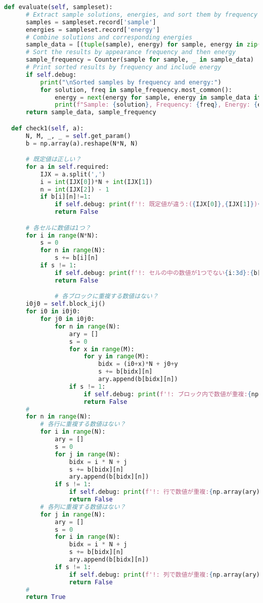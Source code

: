 \documentclass[uplatex,dvipdfmx,a4paper,11pt,oneside,openany]{jsbook}
\begin{document}
\begin{lstlisting}[language=Python]
    def evaluate(self, sampleset):
      # Extract sample solutions, energies, and sort them by frequency
      samples = sampleset.record['sample']
      energies = sampleset.record['energy']
      # Combine solutions and corresponding energies
      sample_data = [(tuple(sample), energy) for sample, energy in zip(samples, energies)]
      # Sort the results by appearance frequency and then energy
      sample_frequency = Counter(sample for sample, _ in sample_data)
      # Print sorted results by frequency and include energy
      if self.debug:
          print("\nSorted samples by frequency and energy:")
          for solution, freq in sample_frequency.most_common():
              energy = next(energy for sample, energy in sample_data if sample == solution)
              print(f"Sample: {solution}, Frequency: {freq}, Energy: {energy:+.2f}")
      return sample_data, sample_frequency

  def check1(self, a):
      N, M, _, _ = self.get_param()
      b = np.array(a).reshape(N*N, N)

      # 既定値は正しい？
      for a in self.required:
          IJX = a.split(',')
          i = int(IJX[0])*N + int(IJX[1])
          n = int(IJX[2]) - 1
          if b[i][n]!=1:
              if self.debug: print(f'!: 既定値が違う:({IJX[0]},{IJX[1]}){IJX[2]}!={b[i]}')
              return False

      # 各セルに数値は1つ？
      for i in range(N*N):
          s = 0
          for n in range(N):
              s += b[i][n]
          if s != 1:
              if self.debug: print(f'!: セルの中の数値が1つでない{i:3d}:{b[i]}')
              return False

              # 各ブロックに重複する数値はない？
      i0j0 = self.block_ij()
      for i0 in i0j0:
          for j0 in i0j0:
              for n in range(N):
                  ary = []
                  s = 0
                  for x in range(M):
                      for y in range(M):
                          bidx = (i0+x)*N + j0+y
                          s += b[bidx][n]
                          ary.append(b[bidx][n])
                  if s != 1:
                      if self.debug: print(f'!: ブロック内で数値が重複:{np.array(ary)}')
                      return False
      #
      for n in range(N):
          # 各行に重複する数値はない？
          for i in range(N):
              ary = []
              s = 0
              for j in range(N):
                  bidx = i * N + j
                  s += b[bidx][n]
                  ary.append(b[bidx][n])
              if s != 1:
                  if self.debug: print(f'!: 行で数値が重複:{np.array(ary)}')
                  return False
          # 各列に重複する数値はない？
          for j in range(N):
              ary = []
              s = 0
              for i in range(N):
                  bidx = i * N + j
                  s += b[bidx][n]
                  ary.append(b[bidx][n])
              if s != 1:
                  if self.debug: print(f'!: 列で数値が重複:{np.array(ary)}')
                  return False
      #
      return True


\end{lstlisting}
\end{document}
